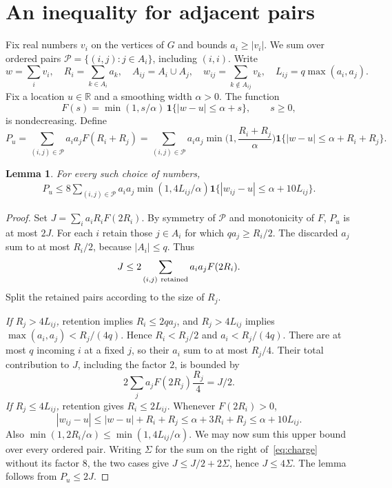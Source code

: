 \documentclass[11pt,a4paper]{article}
\newtheorem{lemma}[theorem]{Lemma}
\newcommand{\R}{\mathbb R}
\newcommand{\ind}{\mathbf 1}
\newcommand{\pairs}{\mathcal P}
\begin{document}
\section{An inequality for adjacent pairs}\label{sec:pairs}
Fix real numbers $v_i$ on the vertices of $G$ and bounds $a_i\ge |v_i|$.
We sum over ordered pairs $\pairs=\{(i,j):j\in A_i\}$, including $(i,i)$.
Write
\begin{equation}\label{eq:pair-notation}
 w=\sum_i v_i,\quad R_i=\sum_{k\in A_i}a_k,\quad
 A_{ij}=A_i\cup A_j,\quad w_{ij}=\sum_{k\notin A_{ij}}v_k,\quad
 L_{ij}=q\max(a_i,a_j).
\end{equation}
Fix a location $u\in\R$ and a smoothing width $\alpha>0$. The function
\begin{equation}\label{eq:F}
 F(s)=\min(1,s/\alpha)\,\ind\{|w-u|\le\alpha+s\},\qquad s\ge0,
\end{equation}
is nondecreasing. Define
\begin{equation}\label{eq:Pu}
 P_u=\sum_{(i,j)\in\pairs}a_i a_j F(R_i+R_j)
 =\sum_{(i,j)\in\pairs}a_i a_j\min\Big(1,\frac{R_i+R_j}{\alpha}\Big)
  \ind\{|w-u|\le\alpha+R_i+R_j\}.
\end{equation}

\begin{lemma}\label{lem:charge}
For every such choice of numbers,
\begin{align}
 P_u
 \le 8\sum_{(i,j)\in\pairs}a_i a_j\min(1,4L_{ij}/\alpha)
       \ind\{|w_{ij}-u|\le\alpha+10L_{ij}\}.       \label{eq:charge}
\end{align}
\end{lemma}
\begin{proof}
Set $J=\sum_i a_iR_i F(2R_i)$. By symmetry of $\pairs$ and monotonicity of $F$, $P_u$ is at most $2J$. For each $i$ retain those $j\in A_i$ for which $q a_j\ge R_i/2$. The discarded $a_j$ sum to at most $R_i/2$, because $|A_i|\le q$. Thus
\[
 J\le2\sum_{(i,j)\ {\rm retained}} a_i a_j F(2R_i).
\]
Split the retained pairs according to the size of $R_j$.

\emph{If $R_j>4L_{ij}$,} retention implies $R_i\le2q a_j$, and $R_j>4L_{ij}$ implies $\max(a_i,a_j)<R_j/(4q)$. Hence $R_i<R_j/2$ and $a_i<R_j/(4q)$. There are at most $q$ incoming $i$ at a fixed $j$, so their $a_i$ sum to at most $R_j/4$. Their total contribution to $J$, including the factor $2$, is bounded by
\[
 2\sum_j a_j F(2R_j)\frac{R_j}{4}=J/2.
\]
\emph{If $R_j\le4L_{ij}$,} retention gives $R_i\le2L_{ij}$. Whenever $F(2R_i)>0$,
\[
 |w_{ij}-u|\le |w-u|+R_i+R_j
 \le \alpha+3R_i+R_j\le\alpha+10L_{ij}.
\]
Also $\min(1,2R_i/\alpha)\le\min(1,4L_{ij}/\alpha)$. We may now sum this upper bound over every ordered pair.
Writing $\Sigma$ for the sum on the right of~\eqref{eq:charge}
without its factor $8$, the two cases give $J\le J/2+2\Sigma$, hence
$J\le4\Sigma$. The lemma follows from $P_u\le2J$.
\end{proof}
\end{document}
